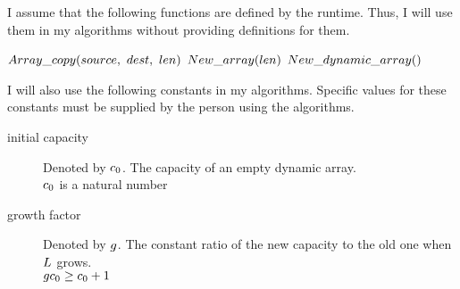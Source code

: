 I assume that the following functions are defined by the runtime. Thus, I will use them in my algorithms without providing definitions for them.

\begin{algorithm}
	\begin{algorithmic}
		\State $\FuncArrayCopy(source,\ dest,\ len)$
		\State
		\State $New\_array(len)$
		\State
		\State $New\_dynamic\_array()$
	\end{algorithmic}
\end{algorithm}

I will also use the following constants in my algorithms. Specific values for these constants must be supplied by the person using the algorithms.

\begin{description}
	\item[initial capacity] Denoted by $c_0$. The capacity of an empty dynamic array.\\
	{\HdrAssumptions} $c_0$ is a natural number
	\item[growth factor] Denoted by $g$. The constant ratio of the new capacity to the old one when $L$ grows.\\
	{\HdrAssumptions} $gc_0 \geq c_0 + 1$
\end{description}